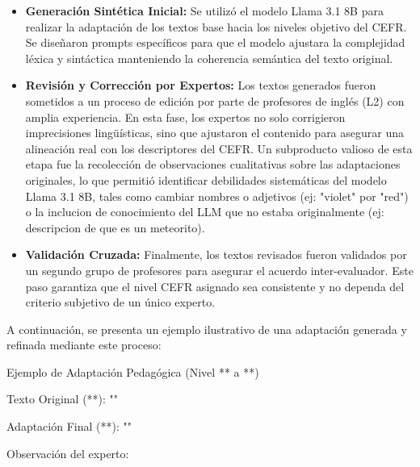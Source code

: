 \begin{itemize}
    \item \textbf{Generación Sintética Inicial:} Se utilizó el modelo Llama 3.1 8B para realizar la adaptación de los textos base hacia los niveles objetivo del CEFR. Se diseñaron prompts específicos para que el modelo ajustara la complejidad léxica y sintáctica manteniendo la coherencia semántica del texto original.

    \item \textbf{Revisión y Corrección por Expertos:} Los textos generados fueron sometidos a un proceso de edición por parte de profesores de inglés (L2) con amplia experiencia. En esta fase, los expertos no solo corrigieron imprecisiones lingüísticas, sino que ajustaron el contenido para asegurar una alineación real con los descriptores del CEFR. Un subproducto valioso de esta etapa fue la recolección de observaciones cualitativas sobre las adaptaciones originales, lo que permitió identificar debilidades sistemáticas del modelo Llama 3.1 8B, tales como cambiar nombres o adjetivos (ej: "violet" por "red") o la inclucion de conocimiento del LLM que no estaba originalmente (ej: descripcion de que es un meteorito).

    \item \textbf{Validación Cruzada:} Finalmente, los textos revisados fueron validados por un segundo grupo de profesores para asegurar el acuerdo inter-evaluador. Este paso garantiza que el nivel CEFR asignado sea consistente y no dependa del criterio subjetivo de un único experto.
\end{itemize}

A continuación, se presenta un ejemplo ilustrativo de una adaptación generada y refinada mediante este proceso:


Ejemplo de Adaptación Pedagógica (Nivel ** a **)

Texto Original (**): ""

Adaptación Final (**): ""

Observación del experto:
